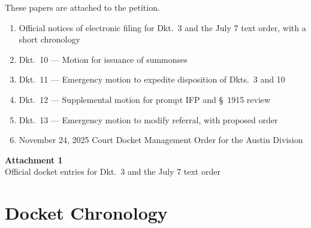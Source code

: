 \documentclass[14pt]{extarticle}
\begin{document}
\vspace{1.1em}
\noindent These papers are attached to the petition.

\vspace{0.5em}
\begin{singlespace}
\begin{enumerate}
\item Official notices of electronic filing for Dkt.\ 3 and the July 7 text order, with a short chronology
\item Dkt.\ 10 --- Motion for issuance of summonses
\item Dkt.\ 11 --- Emergency motion to expedite disposition of Dkts.\ 3 and 10
\item Dkt.\ 12 --- Supplemental motion for prompt IFP and \S\ 1915 review
\item Dkt.\ 13 --- Emergency motion to modify referral, with proposed order
\item November 24, 2025 Court Docket Management Order for the Austin Division
\end{enumerate}
\end{singlespace}

\clearpage
\thispagestyle{empty}
\vspace*{2.2in}
\begin{center}
{\LARGE\bfseries Attachment 1}\\[0.5em]
{\large Official docket entries for Dkt.\ 3 and the July 7 text order}
\end{center}

\clearpage
\section*{Docket Chronology}
\end{document}
